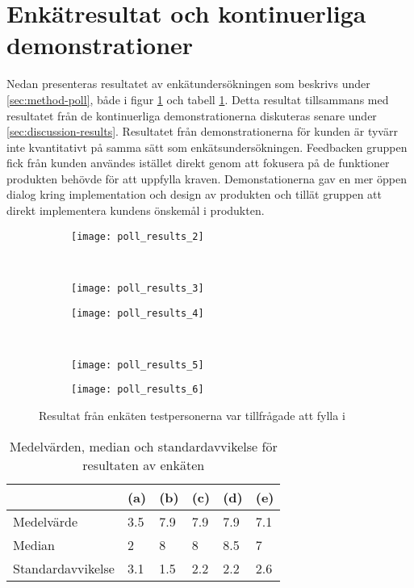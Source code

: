 \section{Enkätresultat och kontinuerliga demonstrationer}

Nedan presenteras resultatet av enkätundersökningen som beskrivs under \ref{sec:method-poll}, både i figur \ref{fig:poll_results} och tabell \ref{tab:poll_results_table}. Detta resultat tillsammans med resultatet från de kontinuerliga demonstrationerna diskuteras senare under \ref{sec:discussion-results}. Resultatet från demonstrationerna för kunden är tyvärr inte kvantitativt på samma sätt som enkätsundersökningen. Feedbacken gruppen fick från kunden användes istället direkt genom att fokusera på de funktioner produkten behövde för att uppfylla kraven. Demonstationerna gav en mer öppen dialog kring implementation och design av produkten och tillät gruppen att direkt implementera kundens önskemål i produkten.

\begin{figure}
    \centering
    \begin{subfigure}[]{0.5\textwidth}
        \centering
        \texttt{[image: poll\_results\_2]}
        \caption{}
    \end{subfigure}%
    ~
    \begin{subfigure}[]{0.5\textwidth}
        \centering
        \texttt{[image: poll\_results\_3]}
        \caption{}
    \end{subfigure}

    \begin{subfigure}[]{0.5\textwidth}
        \centering
        \texttt{[image: poll\_results\_4]}
        \caption{}
    \end{subfigure}%
    ~
    \begin{subfigure}[]{0.5\textwidth}
        \centering
        \texttt{[image: poll\_results\_5]}
        \caption{}
    \end{subfigure}

    \begin{subfigure}[]{0.5\textwidth}
        \centering
        \texttt{[image: poll\_results\_6]}
        \caption{}
    \end{subfigure}%
    \caption{Resultat från enkäten testpersonerna var tillfrågade att fylla i}
    \label{fig:poll_results}
\end{figure}

\begin{table}
    \centering
    \begin{tabular}{| l | l | l | l | l | l |}
        \cline{2-6}
        \multicolumn{1}{c|}{} & (a) & (b) & (c) & (d) & (e) \\ \hline
        Medelvärde & 3.5 & 7.9 & 7.9 & 7.9 & 7.1  \\ \hline
        Median & 2 & 8 & 8 & 8.5 & 7  \\ \hline
        Standardavvikelse & 3.1 & 1.5 & 2.2 & 2.2 & 2.6  \\ \hline
    \end{tabular}
    \caption{Medelvärden, median och standardavvikelse för resultaten av enkäten}
    \label{tab:poll_results_table}
\end{table}
